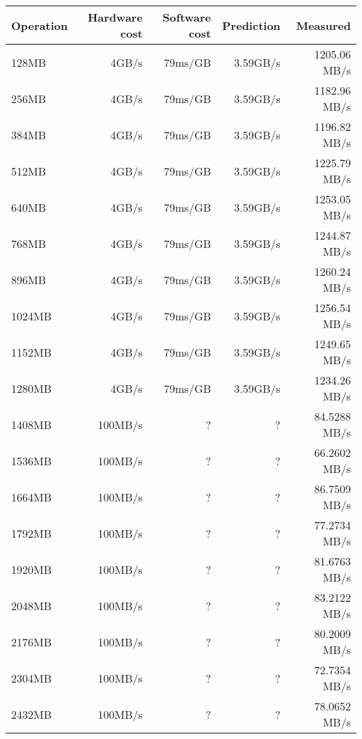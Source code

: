 \begin{table}[h]
\begin{center}
\begin{tabular}{| l | r | r | r | r |} \hline
Operation 			& Hardware cost 	& Software cost 	& Prediction	& Measured \\ \hline





128MB  & 4GB/s   & 79ms/GB & 3.59GB/s & 1205.06 MB/s \\ \hline
256MB  & 4GB/s   & 79ms/GB & 3.59GB/s & 1182.96 MB/s \\ \hline
384MB  & 4GB/s   & 79ms/GB & 3.59GB/s & 1196.82 MB/s \\ \hline
512MB  & 4GB/s   & 79ms/GB & 3.59GB/s & 1225.79 MB/s \\ \hline
640MB  & 4GB/s   & 79ms/GB & 3.59GB/s & 1253.05 MB/s \\ \hline
768MB  & 4GB/s   & 79ms/GB & 3.59GB/s & 1244.87 MB/s \\ \hline
896MB  & 4GB/s   & 79ms/GB & 3.59GB/s & 1260.24 MB/s \\ \hline
1024MB & 4GB/s   & 79ms/GB & 3.59GB/s & 1256.54 MB/s \\ \hline
1152MB & 4GB/s   & 79ms/GB & 3.59GB/s & 1249.65 MB/s \\ \hline
1280MB & 4GB/s   & 79ms/GB & 3.59GB/s & 1234.26 MB/s \\ \hline
1408MB & 100MB/s & ?       & ?        & 84.5288 MB/s \\ \hline
1536MB & 100MB/s & ?       & ?        & 66.2602 MB/s \\ \hline
1664MB & 100MB/s & ?       & ?        & 86.7509 MB/s \\ \hline
1792MB & 100MB/s & ?       & ?        & 77.2734 MB/s \\ \hline
1920MB & 100MB/s & ?       & ?        & 81.6763 MB/s \\ \hline
2048MB & 100MB/s & ?       & ?        & 83.2122 MB/s \\ \hline
2176MB & 100MB/s & ?       & ?        & 80.2009 MB/s \\ \hline
2304MB & 100MB/s & ?       & ?        & 72.7354 MB/s \\ \hline
2432MB & 100MB/s & ?       & ?        & 78.0652 MB/s \\ \hline\hline


\end{tabular}
\end{center}
\end{table}
